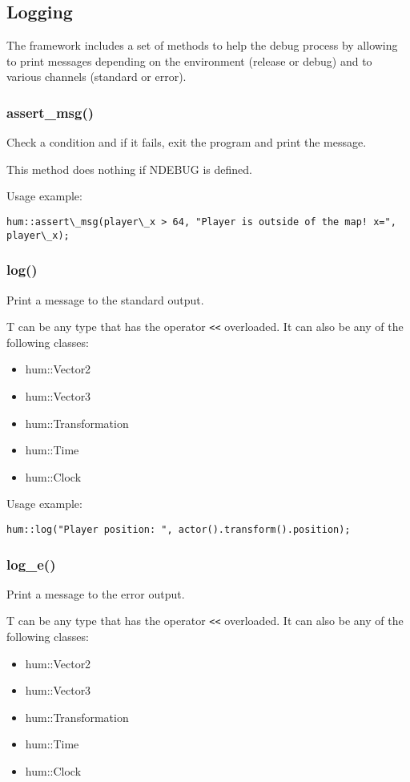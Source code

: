 \subsection{Logging}

The framework includes a set of methods to help the debug process by allowing to print 
messages depending on the environment (release or debug) and to various channels (standard 
or error).

\subsubsection{assert\_msg()}
Check a condition and if it fails, exit the program and print the message.

This method does nothing if NDEBUG is defined.

Usage example:
\begin{lstlisting}[caption= assert\_msg() example]
hum::assert\_msg(player\_x > 64, "Player is outside of the map! x=", player\_x);
\end{lstlisting}


\subsubsection{log()}
Print a message to the standard output.

T can be any type that has the operator \texttt{<<} overloaded.
It can also be any of the following classes:
\begin{itemize}
\item hum::Vector2
\item hum::Vector3
\item hum::Transformation
\item hum::Time
\item hum::Clock
\end{itemize}

Usage example:
\begin{lstlisting}[caption= log() example]
hum::log("Player position: ", actor().transform().position);
\end{lstlisting}

\subsubsection{log\_e()}
Print a message to the error output.

T can be any type that has the operator \texttt{<<} overloaded.
It can also be any of the following classes:
\begin{itemize}
\item hum::Vector2
\item hum::Vector3
\item hum::Transformation
\item hum::Time
\item hum::Clock
\end{itemize}

